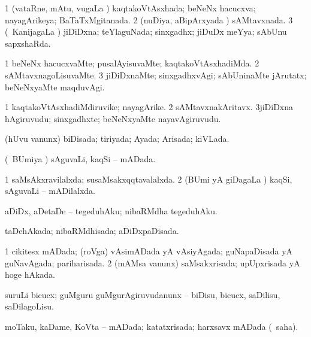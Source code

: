 \bentry
{} 
\gl{\gu}
\expl{}
\bmng
\bnum
\num{1} (vataRne, mAtu, \mo vugaLa \vi) kaqtakoVtAsxhada; beNeNx hacucxva; nayagArikeya; BaTaTxMgitanada. 
\num{2} (nuDiya, aBipArxyada \vi) sAMtavxnada. 
\num{3} (\kanmu\ KanijagaLa \vi) jiDiDxna; teYlaguNada; sinxgadhx; jiDuDx meYya; sAbUnu sapxshaRda. 
\enum
\emng
\eentry

\bentry
{} 
\gl{\kirxvi}
\expl{}
\bmng
\bnum
\num{1} beNeNx hacucxvaMte; pusalAyisuvaMte; kaqtakoVtAsxhadiMda. 
\num{2} sAMtavxnagoLisuvaMte. 
\num{3} jiDiDxnaMte; sinxgadhxvAgi; sAbUninaMte jArutatx; beNeNxyaMte maqduvAgi. 
\enum
\emng
\eentry

\bentry
{} 
\gl{\nA}
\expl{}
\bmng
\bnum
\num{1} kaqtakoVtAsxhadiMdiruvike; nayagArike. 
\num{2} sAMtavxnakAritavx. 
\num{3}jiDiDxna hAgiruvudu; sinxgadhxte; beNeNxyaMte nayavAgiruvudu. 
\enum
\emng
\eentry

\bentry
{} 
\gl{\gu}
\expl{}
\bmng
 (hUvu \mo vanunx) biDisada; tiriyada; Ayada; Arisada; kiVLada. 
\emng
\eentry

\bentry
{} 
\gl{\gu}
\expl{}
\bmng
 (\kanmu\ BUmiya \vi) sAguvaLi, kaqSi -- mADada. 
\emng
\eentry

\bentry
{} 
\gl{\gu}
\expl{}
\bmng
\bnum
\num{1} saMsAkxravilalxda; susaMsakxqqtavalalxda. 
\num{2} (BUmi yA giDagaLa \vi) kaqSi, sAguvaLi -- mADilalxda. 
\enum
\emng
\eentry

\bentry
{} 
\gl{\akirx}
\expl{}
\bmng
 aDiDx, aDetaDe -- tegeduhAku; nibaRMdha tegeduhAku. 
\emng
\eentry

\bentry
{} 
\gl{\gu}
\expl{}
\bmng
 taDehAkada; nibaRMdhisada; aDiDxpaDisada. 
\emng
\eentry

\bentry
{} 
\gl{\gu}
\expl{}
\bmng
\bnum
\num{1} cikitesx mADada; (roVga) vAsimADada yA vAsiyAgada; guNapaDisada yA guNavAgada; pariharisada. 
\num{2} (mAMsa \mo vanunx) saMsakxrisada; upUpxrisada yA hoge hAkada. 
\enum
\emng
\eentry

\bentry
{} 
\gl{\akirx}
\expl{}
\bmng
 suruLi bicucx; guMguru guMgurAgiruvudanunx -- biDisu, bicucx, saDilisu, saDilagoLisu. 
\emng
\eentry

\bentry
{} 
\gl{\gu}
\expl{}
\bmng
 moTaku, kaDame, KoVta -- mADada; katatxrisada; harxsavx mADada (\rUpa\ saha). 
\emng
\eentry

